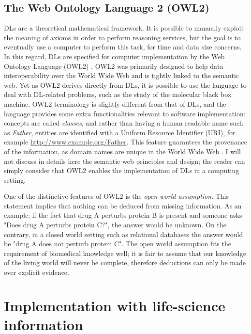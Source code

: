 \subsection{The Web Ontology Language 2 (OWL2)}
DLs are a theoretical mathematical framework. It is possible to manually exploit the meaning of axioms in order to perform reasoning services, but the goal is to eventually use a computer to perform this task, for time and data size concerns. In this regard, DLs are specified for computer implementation by the Web Ontology Language (OWL2) \citep{owlw3c}. OWL2 was primarily designed to help data interoperability over the World Wide Web and is tightly linked to the semantic web. Yet as OWL2 derives directly from DLs, it is possible to use the language to deal with DL-related problems, such as the study of the molecular black box machine. OWL2 terminology is slightly different from that of DLs, and the language provides some extra functionalities relevant to software implementation: concepts are called \emph{classes}, and rather than having a human readable name such as \emph{Father}, entities are identified with a Uniform Resource Identifier (URI), for example \url{http://www.example.org/Father}. This feature guarantees the provenance of the information, as domain names are unique in the World Wide Web \citep{berners2001semantic}. I will not discuss in details here the semantic web principles and design; the reader can simply consider that OWL2 enables the implementation of DLs in a computing setting.

One of the distinctive features of OWL2 is the \emph{open world assumption}. This statement implies that nothing can be deduced from missing information. As an example: if the fact that drug A perturbs protein B is present and someone asks "Does drug A perturbs protein C?", the answer would be unknown. On the contrary, in a closed world setting such as relational databases the answer would be "drug A does not perturb protein C". The open world assumption fits the requirement of biomedical knowledge well; it is fair to assume that our knowledge of the living world will never be complete, therefore deductions can only be made over explicit evidence.

\section{Implementation with life-science information}

